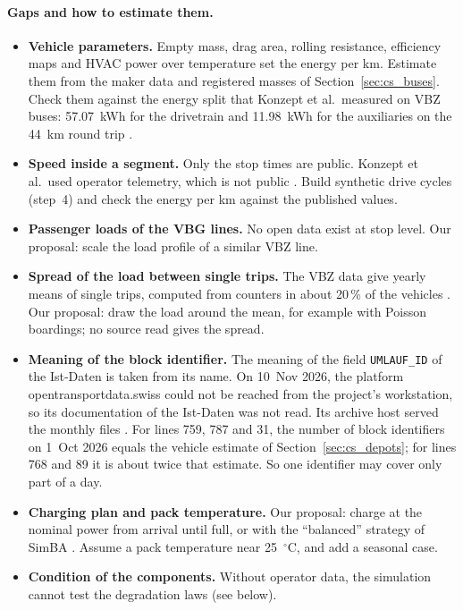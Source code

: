 \documentclass[11pt,a4paper]{article}
\theoremstyle{plain}
\theoremstyle{definition}
\theoremstyle{remark}
\begin{document}
\paragraph{Gaps and how to estimate them.}
\begin{itemize}
  \item \textbf{Vehicle parameters.} Empty mass, drag area, rolling resistance, efficiency maps and HVAC power over temperature set the energy per km.
    Estimate them from the maker data and registered masses of Section~\ref{sec:cs_buses}.
    Check them against the energy split that Konzept et al.\ measured on VBZ buses: 57.07~kWh for the drivetrain and 11.98~kWh for the auxiliaries on the 44~km round trip \cite[Table~1]{Konzept2025}.
  \item \textbf{Speed inside a segment.} Only the stop times are public.
    Konzept et al.\ used operator telemetry, which is not public \cite[Sect.~1.2]{Konzept2025}.
    Build synthetic drive cycles (step~4) and check the energy per km against the published values.
  \item \textbf{Passenger loads of the VBG lines.} No open data exist at stop level.
    Our proposal: scale the load profile of a similar VBZ line.
  \item \textbf{Spread of the load between single trips.} The VBZ data give yearly means of single trips, computed from counters in about 20\,\% of the vehicles \cite{VBZFahrgast2025}.
    Our proposal: draw the load around the mean, for example with Poisson boardings; no source read gives the spread.
  \item \textbf{Meaning of the block identifier.} The meaning of the field \texttt{UMLAUF\_ID} of the Ist-Daten is taken from its name.
    On 10~Nov 2026, the platform opentransportdata.swiss could not be reached from the project's workstation, so its documentation of the Ist-Daten was not read.
    Its archive host served the monthly files \cite{IstDaten2026}.
    For lines 759, 787 and 31, the number of block identifiers on 1~Oct 2026 equals the vehicle estimate of Section~\ref{sec:cs_depots}; for lines 768 and 89 it is about twice that estimate.
    So one identifier may cover only part of a day.
  \item \textbf{Charging plan and pack temperature.} Our proposal: charge at the nominal power from arrival until full, or with the ``balanced'' strategy of SimBA \cite{SimBA2026}.
    Assume a pack temperature near 25~$^\circ$C, and add a seasonal case.
  \item \textbf{Condition of the components.} Without operator data, the simulation cannot test the degradation laws (see below).
\end{itemize}
\end{document}
